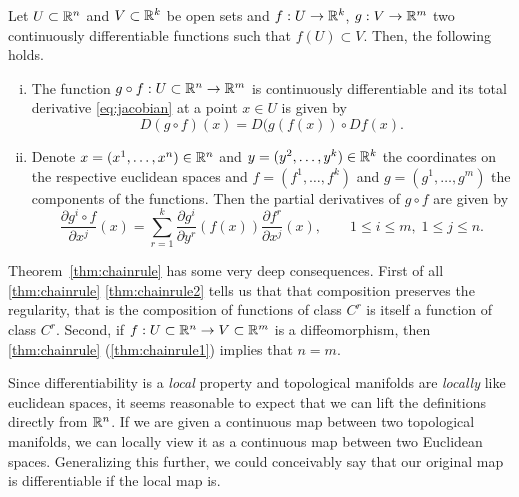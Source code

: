 \begin{thm}\label{thm:chainrule}
Let $U\subset\mathbb{R}^n$ and $V\subset\mathbb{R}^k$ be open sets and $f: U \to \mathbb{R}^k$, $g: V\to\mathbb{R}^m$ two continuously differentiable functions such that $f(U)\subset V$.
Then, the following holds.
\begin{enumerate}[(i)]
  \item\label{thm:chainrule1} The function $g\circ f: U\subset\mathbb{R}^n \to\mathbb{R}^m$ is continuously differentiable and its total derivative \eqref{eq:jacobian} at a point $x\in U$ is given by
\begin{equation}
  D(g\circ f)(x) = D(g(f(x)) \circ Df(x).
\end{equation}
\item\label{thm:chainrule2} Denote $x=(x^1, \ldots, x^n)\in\mathbb{R}^n$ and $y=(y^2,\ldots,y^k)\in\mathbb{R}^k$ the coordinates on the respective euclidean spaces and $f=(f^1,\ldots,f^k)$ and $g=(g^1,\ldots,g^m)$ the components of the functions. Then the partial derivatives of $g\circ f$ are given by
\begin{equation}
  \frac{\partial g^i\circ f}{\partial x^j}(x)
  = \sum_{r=1}^k \frac{\partial g^i}{\partial y^r}(f(x)) \frac{\partial f^r}{\partial x^j}(x),
\qquad 1\leq i \leq m,\; 1\leq j\leq n.
\end{equation}
\end{enumerate}
\end{thm}

\begin{rmk}
Theorem~\ref{thm:chainrule} has some very deep consequences.
First of all \ref{thm:chainrule} \ref{thm:chainrule2} tells us that that composition preserves the regularity, that is the composition of functions  of class $C^r$ is itself a function of class $C^r$.
Second, if $f:U\subset\mathbb{R}^n\to V\subset\mathbb{R}^m$ is a diffeomorphism, then \ref{thm:chainrule} (\ref{thm:chainrule1}) implies that $n=m$.
\end{rmk}

Since differentiability is a \emph{local} property and topological manifolds are \emph{locally} like euclidean spaces, it seems reasonable to expect that we can lift the definitions directly from $\mathbb{R}^n$.
If we are given a continuous map between two topological manifolds, we can locally view it as a continuous map between two Euclidean spaces.
Generalizing this further, we could conceivably say that our original map is differentiable if the local map is.

